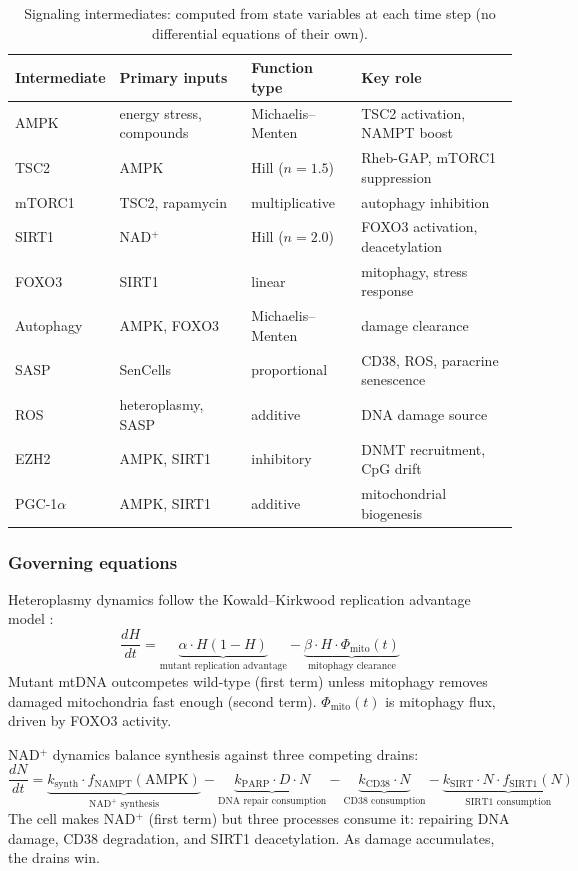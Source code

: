 \documentclass[11pt]{article}
\begin{document}
\begin{table}[ht]
\centering
\caption{Signaling intermediates: computed from state variables at each time step (no differential equations of their own).}
\label{tab:intermediates}
\begin{tabular}{@{}llll@{}}
\toprule
Intermediate & Primary inputs & Function type & Key role \\
\midrule
AMPK & energy stress, compounds & Michaelis--Menten & TSC2 activation, NAMPT boost \\ \hline
TSC2 & AMPK & Hill ($n = 1.5$) & Rheb-GAP, mTORC1 suppression \\ \hline
mTORC1 & TSC2, rapamycin & multiplicative & autophagy inhibition \\ \hline
SIRT1 & NAD$^+$ & Hill ($n = 2.0$) & FOXO3 activation, deacetylation \\ \hline
FOXO3 & SIRT1 & linear & mitophagy, stress response \\ \hline
Autophagy & AMPK, FOXO3 & Michaelis--Menten & damage clearance \\ \hline
SASP & SenCells & proportional & CD38, ROS, paracrine senescence \\ \hline
ROS & heteroplasmy, SASP & additive & DNA damage source \\ \hline
EZH2 & AMPK, SIRT1 & inhibitory & DNMT recruitment, CpG drift \\ \hline
PGC-1$\alpha$ & AMPK, SIRT1 & additive & mitochondrial biogenesis \\
\bottomrule
\end{tabular}
\end{table}

\subsubsection{Governing equations}

Heteroplasmy dynamics follow the Kowald--Kirkwood replication advantage model \citep{Kowald1993}:
\begin{equation}
\frac{dH}{dt} = \underbrace{\alpha \cdot H(1 - H)}_{\text{mutant replication advantage}} - \underbrace{\beta \cdot H \cdot \Phi_{\text{mito}}(t)}_{\text{mitophagy clearance}}
\end{equation}
Mutant mtDNA outcompetes wild-type (first term) unless mitophagy removes damaged mitochondria fast enough (second term). $\Phi_{\text{mito}}(t)$ is mitophagy flux, driven by FOXO3 activity.

NAD$^+$ dynamics balance synthesis against three competing drains:
\begin{equation}
\frac{dN}{dt} = \underbrace{k_{\text{synth}} \cdot f_{\text{NAMPT}}(\text{AMPK})}_{\text{NAD$^+$ synthesis}} - \underbrace{k_{\text{PARP}} \cdot D \cdot N}_{\text{DNA repair consumption}} - \underbrace{k_{\text{CD38}} \cdot N}_{\text{CD38 consumption}} - \underbrace{k_{\text{SIRT}} \cdot N \cdot f_{\text{SIRT1}}(N)}_{\text{SIRT1 consumption}}
\end{equation}
The cell makes NAD$^+$ (first term) but three processes consume it: repairing DNA damage, CD38 degradation, and SIRT1 deacetylation. As damage accumulates, the drains win.
\end{document}
